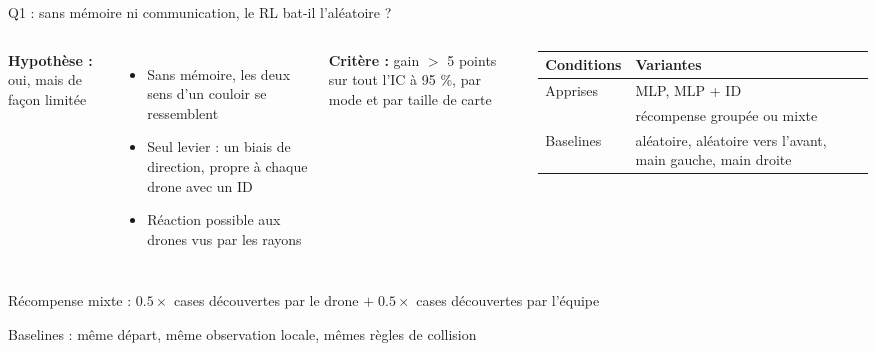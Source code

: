 \documentclass[aspectratio=169,11pt]{beamer}
\begin{document}
\begin{frame}{Q1 : sans mémoire ni communication, le RL bat-il l'aléatoire ?}
  \begin{columns}[T]
    \small
    \textbf{Hypothèse :} oui, mais de façon limitée
    \begin{itemize}
      \item Sans mémoire, les deux sens d'un couloir se ressemblent
      \item Seul levier : un biais de direction, propre à chaque drone avec un ID
      \item Réaction possible aux drones vus par les rayons
    \end{itemize}

    \textbf{Critère :} gain $>$ 5 points sur tout l'IC à 95 \%, par mode et par taille de carte

    \small
    \begin{tabular}{lp{4.6cm}}
      \toprule
      Conditions & Variantes \\
      \midrule
      Apprises & MLP, MLP + ID \\
      & récompense groupée ou mixte \\
      \midrule
      Baselines & aléatoire, aléatoire vers l'avant, main gauche, main droite \\
      \bottomrule
    \end{tabular}
  \end{columns}

  \vfill
  {\footnotesize\setlength{\parskip}{0pt}
    Récompense mixte : $0.5 \times$ cases découvertes par le drone $+ \; 0.5 \times$ cases découvertes par l'équipe\par
    Baselines : même départ, même observation locale, mêmes règles de collision\par}
\end{frame}
\end{document}
